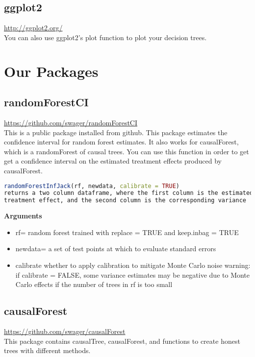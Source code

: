 \documentclass{article}
\begin{document}
 \subsection{ggplot2}\url{http://ggplot2.org/}\\
 You can also use ggplot2's plot function to plot your decision trees. 
 \section{Our Packages}
 \subsection{randomForestCI}
 	\url{https://github.com/swager/randomForestCI} \\
This is a public package installed from github. 
This package estimates the confidence interval for random forest estimates. 
It also works for causalForest, which is a randomForest of causal trees. You can use this function in order to get get a confidence interval on the estimated treatment effects produced by causalForest. 
\begin{lstlisting}[language=R]
randomForestInfJack(rf, newdata, calibrate = TRUE)
returns a two column dataframe, where the first column is the estimated 
treatment effect, and the second column is the corresponding variance
\end{lstlisting}

\textbf{Arguments} \\
\begin{itemize}
  \item rf= random forest trained with replace = TRUE and keep.inbag = TRUE
  \item newdata= a set of test points at which to evaluate standard errors
  \item calibrate whether to apply calibration to mitigate Monte Carlo noise
	   warning: if calibrate = FALSE, some variance estimates may be negative
	   due to Monte Carlo effects if the number of trees in rf is too small
\end{itemize}

\subsection{causalForest} \url{https://github.com/swager/causalForest}\\
This package contains causalTree, causalForest, and functions to create honest trees with different methods. 
\end{document}
